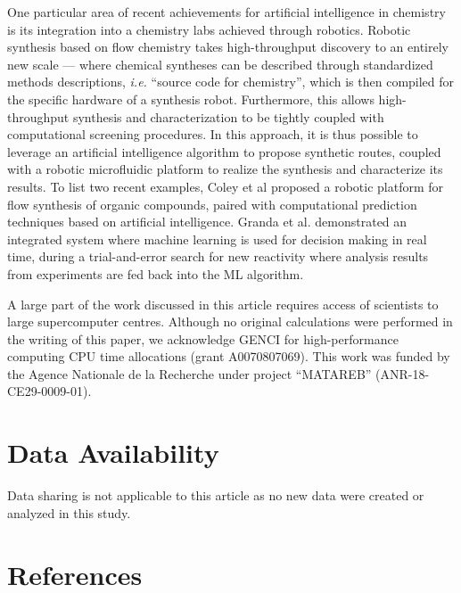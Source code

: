 \documentclass[aip,apm,amsmath,amssymb,reprint]{revtex4-2}
\begin{document}
One particular area of recent achievements for artificial intelligence in chemistry is its integration into a chemistry labs achieved through robotics.\cite{Gromski2020} Robotic synthesis based on flow chemistry takes high-throughput discovery to an entirely new scale --- where chemical syntheses can be described through standardized methods descriptions, \emph{i.e.} ``source code for chemistry'', which is then compiled for the specific hardware of a synthesis robot.\cite{Steiner2019} Furthermore, this allows high-throughput synthesis and characterization to be tightly coupled with computational screening procedures.\cite{Greenaway2018} In this approach, it is thus possible to leverage an artificial intelligence algorithm to propose synthetic routes, coupled with a robotic microfluidic platform to realize the synthesis and characterize its results.\cite{Empel2019} To list two recent examples, Coley et al proposed a robotic platform for flow synthesis of organic compounds, paired with computational prediction techniques based on artificial intelligence.\cite{Coley2019} Granda et al. demonstrated an integrated system where machine learning is used for decision making in real time, during a trial-and-error search for new reactivity where analysis results from experiments are fed back into the ML algorithm.\cite{Granda2018}



\begin{acknowledgments}
A large part of the work discussed in this article requires access of scientists to large supercomputer centres. Although no original calculations were performed in the writing of this paper, we acknowledge GENCI for high-performance computing CPU time allocations (grant A0070807069). This work was funded by the Agence Nationale de la Recherche under project ``MATAREB'' (ANR-18-CE29-0009-01).
\end{acknowledgments}

\section*{Data Availability}
Data sharing is not applicable to this article as no new data were created or analyzed in this study.

\section*{References}

\end{document}
